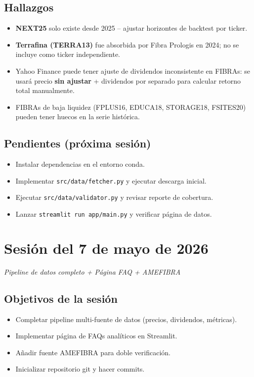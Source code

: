 \documentclass[12pt, a4paper]{article}
\newcommand{\sesion}[2]{%
  \section{Sesi\'{o}n del #1}%
  \textit{#2}%
  \vspace{0.5em}%
}
\begin{document}
\subsection{Hallazgos}
\begin{itemize}
  \item \textbf{NEXT25} solo existe desde 2025 -- ajustar horizontes de backtest por ticker.
  \item \textbf{Terrafina (TERRA13)} fue absorbida por Fibra Prologis en 2024; no se incluye como ticker independiente.
  \item Yahoo Finance puede tener ajuste de dividendos inconsistente en FIBRAs: se usar\'{a} precio \textbf{sin ajustar} + dividendos por separado para calcular retorno total manualmente.
  \item FIBRAs de baja liquidez (FPLUS16, EDUCA18, STORAGE18, FSITES20) pueden tener huecos en la serie hist\'{o}rica.
\end{itemize}

\subsection{Pendientes (pr\'{o}xima sesi\'{o}n)}
\begin{itemize}
  \item[$\boxtimes$] Instalar dependencias en el entorno conda.
  \item[$\boxtimes$] Implementar \texttt{src/data/fetcher.py} y ejecutar descarga inicial.
  \item[$\boxtimes$] Ejecutar \texttt{src/data/validator.py} y revisar reporte de cobertura.
  \item[$\boxtimes$] Lanzar \texttt{streamlit run app/main.py} y verificar p\'{a}gina de datos.
\end{itemize}

\newpage
\sesion{7 de mayo de 2026}{Pipeline de datos completo + P\'{a}gina FAQ + AMEFIBRA}

\subsection{Objetivos de la sesi\'{o}n}
\begin{itemize}
  \item Completar pipeline multi-fuente de datos (precios, dividendos, m\'{e}tricas).
  \item Implementar p\'{a}gina de FAQs anal\'{i}ticos en Streamlit.
  \item A\~{n}adir fuente AMEFIBRA para doble verificaci\'{o}n.
  \item Inicializar repositorio git y hacer commits.
\end{itemize}
\end{document}
